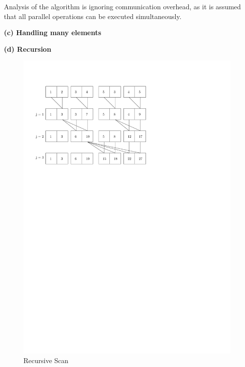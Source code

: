 \documentclass[a4paper,twoside,11pt]{article}
\begin{document}
Analysis of the algorithm is ignoring communication overhead, as it is assumed that all parallel operations can be executed simultaneously.



\textbf{(c) Handling many elements}


\textbf{(d) Recursion}

\begin{figure}[hbtp]
\centering
\label{fig:para_algo}
\includegraphics[scale=1]{recur}
\caption{Recursive Scan}
\end{figure}
\end{document}
